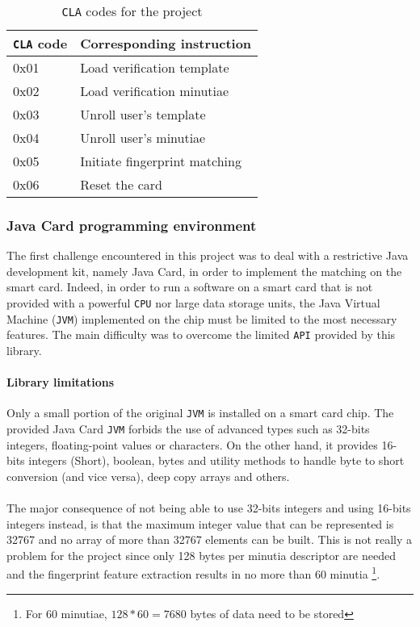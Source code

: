 \documentclass[a4paper,12pt]{article}
\begin{document}
\begin{table}[!htbp]
\centering
\begin{tabular}{|l|l|}
  \hline
  \textbf{\texttt{CLA} code} & \textbf{Corresponding instruction} \\
  \hline
  0x01 & Load verification template\\
   \hline
  0x02 & Load verification minutiae\\
   \hline
  0x03 & Unroll user's template\\
   \hline
  0x04 & Unroll user's minutiae\\
   \hline
  0x05 & Initiate fingerprint matching\\
   \hline
  0x06 & Reset the card\\
  \hline
\end{tabular}
\FloatBarrier

\caption{\texttt{CLA} codes for the project}
\label{tab:clas}
\end{table}



\subsubsection{Java Card programming environment}
The first challenge encountered in this project was to deal with a restrictive Java development kit, namely Java Card, in order to implement the matching on the smart card. Indeed, in order to run a software on a smart card that is not provided with a powerful \texttt{CPU} nor large data storage units, the Java Virtual Machine (\texttt{JVM}) implemented on the chip must be limited to the most necessary features. The main difficulty was to overcome the limited \texttt{API} provided by this library.

\paragraph{Library limitations}
\label{limitations}
Only a small portion of the original \texttt{JVM} is installed on a smart card chip. The provided Java Card \texttt{JVM} forbids the use of advanced types such as 32-bits integers, floating-point values or characters. On the other hand, it provides 16-bits integers (Short), boolean, bytes and utility methods to handle byte to short conversion (and vice versa), deep copy arrays and others.
\\\\
The major consequence of not being able to use 32-bits integers and using 16-bits integers instead, is that the maximum integer value that can be represented is 32767 and no array of more than 32767 elements can be built. This is not really a problem for the project since only 128 bytes per minutia descriptor are needed and the fingerprint feature extraction results in no more than 60 minutia \footnote{For 60 minutiae, $ 128 * 60 = 7680 $ bytes of data need to be stored}.\\
\newpage
\end{document}
